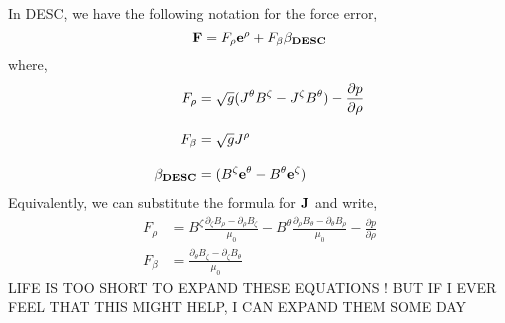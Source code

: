 In DESC, we have the following notation for the force error,
\begin{equation}
    \mathbf{F} = F_\rho \mathbf{e}^\rho + F_\beta \mathbf{\beta_{DESC}}
\end{equation}
where,
\begin{align}
    F_\rho &=  \sqrt{g} (J^\theta B^\zeta - J^\zeta B^\theta) -\frac{\partial p}{\partial \rho}\\[.3cm]
    F_\beta &=  \sqrt{g} J^\rho \\[.3cm]
    \mathbf{\beta_{DESC}} &=  (B^\zeta\mathbf{e}^\theta - B^\theta\mathbf{e}^\zeta) 
\end{align}
Equivalently, we can substitute the formula for $\mathbf{J}$ and write,
\begin{align}
    F_\rho &=  B^\zeta \frac{\partial_\zeta B_\rho - \partial_\rho B_\zeta}{\mu_0} - B^\theta \frac{\partial_\rho B_\theta - \partial_\theta B_\rho}{\mu_0} -\frac{\partial p}{\partial \rho}\\[.3cm]
    F_\beta &=  \frac{\partial_\theta B_\zeta - \partial_\zeta B_\theta}{\mu_0} 
\end{align}
{\color{red} LIFE IS TOO SHORT TO EXPAND THESE EQUATIONS ! BUT IF I EVER FEEL THAT THIS MIGHT HELP, I CAN EXPAND THEM SOME DAY}
